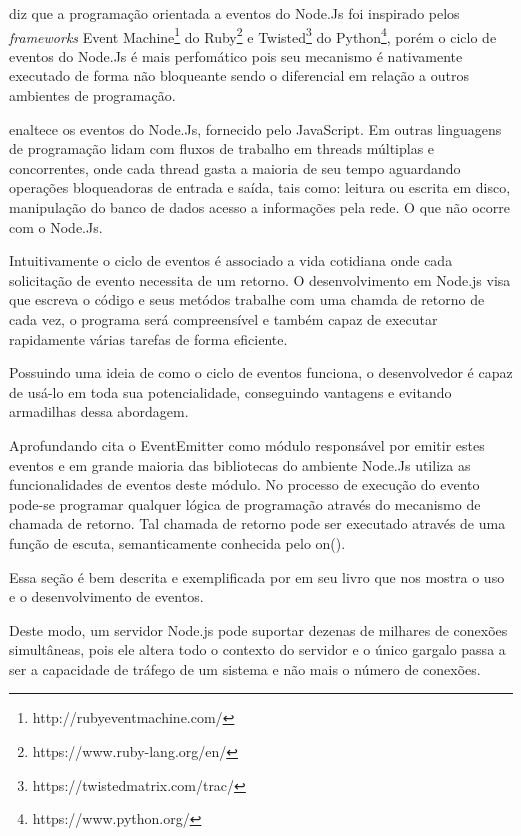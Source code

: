   \cite{Pereira:2013} diz que a programação orientada a eventos do Node.Js 
  foi inspirado pelos \textit{frameworks} Event Machine\footnote{http://rubyeventmachine.com/} do 
  Ruby\footnote{https://www.ruby-lang.org/en/} e Twisted\footnote{https://twistedmatrix.com/trac/} do 
  Python\footnote{https://www.python.org/}, porém o ciclo de eventos do Node.Js é mais perfomático pois seu mecanismo 
  é nativamente executado de forma não bloqueante sendo o diferencial em relação a outros ambientes de programação.
  
  \cite{Wilson:2013} enaltece os eventos do Node.Js, fornecido pelo JavaScript. Em outras linguagens de programação 
  lidam com fluxos de trabalho em threads múltiplas e concorrentes, onde cada thread gasta a maioria de seu tempo aguardando 
  operações bloqueadoras de entrada e saída, tais como: leitura ou escrita em disco, manipulação do banco de dados 
  acesso a informações pela rede. O que não ocorre com o Node.Js.
   
  Intuitivamente o ciclo de eventos é associado a vida cotidiana onde cada solicitação de evento necessita de um retorno. 
  O desenvolvimento em Node.js visa que escreva o código e seus metódos trabalhe com uma chamda de retorno de cada vez, 
  o programa será compreensível e também capaz de executar rapidamente várias tarefas de forma eficiente.\cite{Hughes:2012}
  
  Possuindo uma ideia de como o ciclo de eventos funciona, o desenvolvedor é capaz de usá-lo em toda sua potencialidade, 
  conseguindo vantagens e evitando armadilhas dessa abordagem.\cite{Hughes:2012}
  
  Aprofundando \cite{Pereira:2013} cita o EventEmitter como módulo responsável por emitir estes eventos e em 
  grande maioria das bibliotecas do ambiente Node.Js utiliza as funcionalidades de eventos deste módulo. 
  No processo de execução do evento pode-se programar qualquer lógica de programação através do 
  mecanismo de chamada de retorno. Tal chamada de retorno pode ser executado através de uma função de escuta, 
  semanticamente conhecida pelo on().
  
  Essa seção é bem descrita e exemplificada por \cite{Wilson:2013} em seu livro que nos mostra o uso e o 
  desenvolvimento de eventos.

  Deste modo, um servidor Node.js pode suportar dezenas de milhares de conexões simultâneas, 
  pois ele altera todo o contexto do servidor e o único gargalo passa a ser a capacidade de tráfego 
  de um sistema e não mais o número de conexões.\cite{Abernethy:2011}
  
